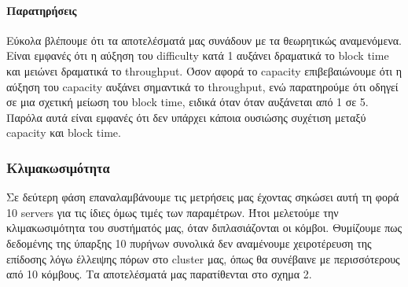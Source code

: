 \documentclass[titlepage]{article}
\begin{document}
\paragraph{Παρατηρήσεις}

Εύκολα βλέπουμε ότι τα αποτελέσματά μας συνάδουν με τα θεωρητικώς αναμενόμενα. Είναι εμφανές ότι η αύξηση του difficulty κατά 1 αυξάνει δραματικά το block time και μειώνει δραματικά το throughput. Όσον αφορά το capacity επιβεβαιώνουμε ότι η αύξηση του capacity αυξάνει σημαντικά το throughput, ενώ παρατηρούμε ότι οδηγεί σε μια σχετική μείωση του block time, ειδικά όταν όταν αυξάνεται από 1 σε 5. Παρόλα αυτά είναι εμφανές ότι δεν υπάρχει κάποια ουσιώσης συχέτιση μεταξύ capacity και block time.

\subsubsection{Κλιμακωσιμότητα}

Σε δεύτερη φάση επαναλαμβάνουμε τις μετρήσεις μας έχοντας σηκώσει αυτή τη φορά 10 servers για τις ίδιες όμως τιμές των παραμέτρων. Ήτοι μελετούμε την κλιμακωσιμότητα του συστήματός μας, όταν διπλασιάζονται οι κόμβοι. Θυμίζουμε πως δεδομένης της ύπαρξης 10 πυρήνων συνολικά δεν αναμένουμε χειροτέρευση της επίδοσης λόγω έλλειψης πόρων στο cluster μας, όπως θα συνέβαινε με περισσότερους από 10 κόμβους. Τα αποτελέσματά μας παρατίθενται στο σχημα 2.
\end{document}

